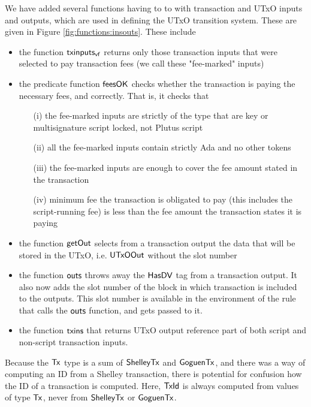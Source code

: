 We have added several functions having to to with transaction and UTxO inputs and
outputs, which are used in defining the UTxO transition system. These are
given in Figure \ref{fig:functions:insouts}. These include

\begin{itemize}
  \item the function $\mathsf{txinputs_{vf}}$ returns only those transaction inputs
  that were selected to pay transaction fees (we call these "fee-marked" inputs)
  \item the predicate function $\mathsf{feesOK}$ checks whether the transaction is
  paying the necessary fees, and correctly. That is, it checks that
  \begin{itemize}
    \item[(i)] the fee-marked inputs are strictly of the type that are key or
    multisignature script locked, not Plutus script
    \item [(ii)] all the fee-marked inputs contain strictly Ada and no other tokens
    \item [(iii)] the fee-marked inputs are enough to cover the fee amount stated
    in the transaction
    \item [(iv)] minimum fee the transaction is obligated to pay (this includes
    the script-running fee) is less than the fee amount the transaction states
    it is paying
  \end{itemize}
  \item the function $\mathsf{getOut}$ selects from a transaction output the data that
  will be stored in the UTxO, i.e. $\mathsf{UTxOOut}$ without the slot number
  \item the function $\mathsf{outs}$ throws away the $\mathsf{HasDV}$ tag from a
  transaction output. It also now adds the slot number of the block in which transaction is
  included to the outputs. This slot number is available in the
  environment of the rule that calls the $\mathsf{outs}$ function, and gets
  passed to it.
  \item the function $\mathsf{txins}$ that returns UTxO output reference part of both script
  and non-script transaction inputs.
\end{itemize}

Because the $\mathsf{Tx}$ type is a sum of $\mathsf{ShelleyTx}$ and $\mathsf{GoguenTx}$, and
there was a way of computing an ID from a Shelley transaction, there
is potential for confusion how the ID of a transaction is
computed. Here, $\mathsf{TxId}$ is always computed from values of type $\mathsf{Tx}$,
never from $\mathsf{ShelleyTx}$ or $\mathsf{GoguenTx}$.


